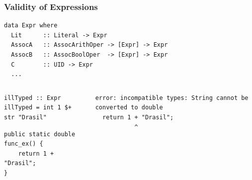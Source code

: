 \documentclass[xcolor={dvipsnames}]{beamer}
\begin{document}
\begin{frame}[fragile]
  \frametitle{Validity of Expressions}

\begin{verbatim}
data Expr where
  Lit      :: Literal -> Expr
  AssocA   :: AssocArithOper -> [Expr] -> Expr
  AssocB   :: AssocBoolOper  -> [Expr] -> Expr
  C        :: UID -> Expr
  ...
\end{verbatim}

\begin{columns}
  \begin{column}{0.575\textwidth}
    \begin{verbatim}
illTyped :: Expr
illTyped = int 1 $+ str "Drasil"
    \end{verbatim}
    \vspace{0.5em}
    \begin{verbatim}
public static double func_ex() {
    return 1 + "Drasil";
}
    \end{verbatim}
  \end{column}
  \hfill
  \begin{column}{0.375\textwidth}
    \begin{verbatim}
error: incompatible types: String cannot be converted to double
  return 1 + "Drasil";
           ^
    \end{verbatim}
  \end{column}
\end{columns}

\end{frame}
\end{document}
